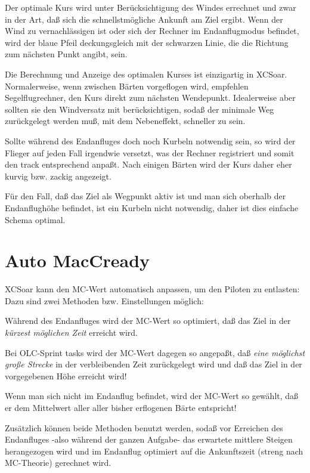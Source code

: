 Der optimale Kurs wird unter Berücksichtigung des Windes errechnet und zwar in der Art, daß sich die
schnellstmögliche Ankunft am Ziel ergibt. Wenn der Wind zu vernachlässigen ist oder sich der Rechner im
Endanflugmodus befindet, wird der blaue
Pfeil deckungsgleich mit der schwarzen Linie, die die Richtung zum nächsten Punkt angibt, sein.

Die Berechnung und Anzeige des optimalen Kurses ist einzigartig in \textsf{XCSoar}. Normalerweise,
wenn zwischen Bärten vorgeflogen wird, empfehlen Segelflugrechner, den Kurs direkt zum nächsten Wendepunkt.
Idealerweise aber sollten sie den Windversatz mit berücksichtigen, sodaß der minimale Weg zurückgelegt werden
muß, mit dem Nebeneffekt, schneller zu sein.

Sollte während des Endanfluges doch noch Kurbeln notwendig sein, so wird der Flieger auf jeden Fall
irgendwie versetzt, was der Rechner registriert und somit den track entsprechend anpaßt. Nach einigen
Bärten wird der Kurs daher eher kurvig bzw. zackig  angezeigt.

Für den Fall, daß das Ziel als Wegpunkt aktiv ist und man sich oberhalb der Endanflughöhe befindet, ist
ein Kurbeln nicht notwendig, daher ist dies einfache Schema optimal.

\section{Auto MacCready}\label{sec:auto-maccready}
\textsf{XCSoar} kann den MC-Wert automatisch anpassen, um den Piloten zu entlasten:
Dazu sind zwei Methoden bzw. Einstellungen möglich:
\begin{description}
\item[Endanflug]  
Während des Endanfluges wird der MC-Wert so optimiert, daß das Ziel in der
\emph{kürzest möglichen Zeit} erreicht wird.

Bei OLC-Sprint tasks wird der MC-Wert dagegen so angepaßt, daß \emph{eine
möglichst große Strecke} in der verbleibenden Zeit zurückgelegt wird und daß
das Ziel in der vorgegebenen Höhe erreicht wird!
\item[Erwartetes mittleres Steigen]
Wenn man sich nicht im Endanflug befindet, wird der MC-Wert so gewählt, daß er dem
Mittelwert aller aller bisher erflogenen Bärte entspricht!
\item[Beides] Zusätzlich können beide Methoden benutzt werden, sodaß vor
Erreichen des Endanfluges -also während der ganzen Aufgabe- das erwartete mittlere
Steigen herangezogen wird und im Endanflug optimiert auf die
 Ankunftszeit (streng nach MC-Theorie)  gerechnet wird.
\end{description}

